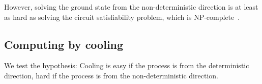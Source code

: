 \documentclass[twocolumn,superscriptaddress,english,showpacs,longbibliography]{revtex4-2}
\begin{document}
However, solving the ground state from the non-deterministic direction is at least as hard as solving the circuit satisfiability problem, which is NP-complete~\cite{Moore2011}.







\subsection{Computing by cooling}\label{local-cooling}

We test the hypothesis: Cooling is easy if the process is from the
deterministic direction, hard if the process is from the
non-deterministic direction.
\end{document}
